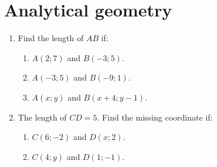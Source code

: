 \chapter{Analytical geometry}
\begin{exercises}{}{
\begin{enumerate}[label=\textbf{\arabic*}.]
\item Find the length of $AB$ if:
 \begin{enumerate}[noitemsep, label=\textbf{(\alph*)} ] 
\item $A(2;7)$ and $B(-3;5)$.
\item $A(-3;5)$ and $B(-9;1)$.
\item $A(x;y)$ and $B(x+4;y-1)$.
\end{enumerate}
\item The length of $CD=5$. Find the missing coordinate if:
 \begin{enumerate}[noitemsep, label=\textbf{(\alph*)} ] 
\item $C(6;-2)$ and $D(x;2)$.
\item $C(4;y)$ and $D(1;-1)$.
\end{enumerate}
\end{enumerate}
}
\end{exercises}


